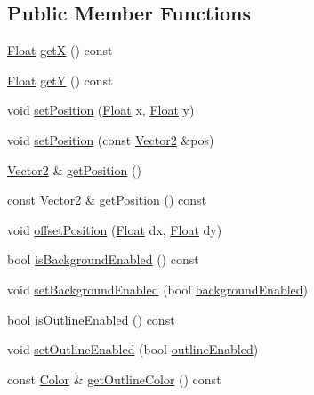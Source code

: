 \subsection*{Public Member Functions}
\begin{DoxyCompactItemize}
\item 
\hyperlink{namespaceZeta_a1e0a1265f9b3bd3075fb0fabd39088ba}{Float} \hyperlink{classZeta_1_1Shape_a481b69bb98662c19663216e28e78e83d}{get\+X} () const 
\item 
\hyperlink{namespaceZeta_a1e0a1265f9b3bd3075fb0fabd39088ba}{Float} \hyperlink{classZeta_1_1Shape_a1724fbcd620ee41b19528fdfb6029377}{get\+Y} () const 
\item 
void \hyperlink{classZeta_1_1Shape_a1701b86c4015032cf25ce63c4a2538c6}{set\+Position} (\hyperlink{namespaceZeta_a1e0a1265f9b3bd3075fb0fabd39088ba}{Float} x, \hyperlink{namespaceZeta_a1e0a1265f9b3bd3075fb0fabd39088ba}{Float} y)
\item 
void \hyperlink{classZeta_1_1Shape_a59f686d454ab8c8840d7d8a942259b54}{set\+Position} (const \hyperlink{classZeta_1_1Vector2}{Vector2} \&pos)
\item 
\hyperlink{classZeta_1_1Vector2}{Vector2} \& \hyperlink{classZeta_1_1Shape_aad7487725bac7b1e3002ccf8f756e4ae}{get\+Position} ()
\item 
const \hyperlink{classZeta_1_1Vector2}{Vector2} \& \hyperlink{classZeta_1_1Shape_aad2a1fc749aaf84463b096ccac64d406}{get\+Position} () const 
\item 
void \hyperlink{classZeta_1_1Shape_a2e2e58e81986309f17514cde13146086}{offset\+Position} (\hyperlink{namespaceZeta_a1e0a1265f9b3bd3075fb0fabd39088ba}{Float} dx, \hyperlink{namespaceZeta_a1e0a1265f9b3bd3075fb0fabd39088ba}{Float} dy)
\item 
bool \hyperlink{classZeta_1_1Shape_a72269cd2f8c81f6a2ea7d3b913b47b62}{is\+Background\+Enabled} () const 
\item 
void \hyperlink{classZeta_1_1Shape_a59c1351cfd203b8375c3831b1829970a}{set\+Background\+Enabled} (bool \hyperlink{classZeta_1_1Shape_add1c090c91ae81618c02e99c2faa00f4}{background\+Enabled})
\item 
bool \hyperlink{classZeta_1_1Shape_a3d35f70c36eddb457392224354325bf5}{is\+Outline\+Enabled} () const 
\item 
void \hyperlink{classZeta_1_1Shape_a83ba281ed26b72b032eee349e83a46fd}{set\+Outline\+Enabled} (bool \hyperlink{classZeta_1_1Shape_abc2977287c5a9d23e7feb098efeb2b21}{outline\+Enabled})
\item 
const \hyperlink{classZeta_1_1Color}{Color} \& \hyperlink{classZeta_1_1Shape_ac9f8057b6617b3e1207226c8173b885d}{get\+Outline\+Color} () const 

\end{DoxyCompactItemize}
